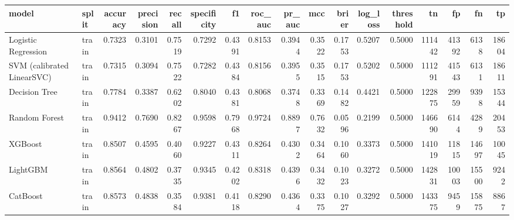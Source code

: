 \begin{tabular}{llrrrrrrrrrrrrrrr}
\toprule
model & split & accuracy & precision & recall & specificity & f1 & roc\_auc & pr\_auc & mcc & brier & log\_loss & threshold & tn & fp & fn & tp \\
\midrule
Logistic Regression & train & 0.7323 & 0.3101 & 0.7519 & 0.7292 & 0.4391 & 0.8153 & 0.3944 & 0.3522 & 0.1753 & 0.5207 & 0.5000 & 111442 & 41392 & 6138 & 18604 \\
SVM (calibrated LinearSVC) & train & 0.7315 & 0.3094 & 0.7522 & 0.7282 & 0.4384 & 0.8156 & 0.3955 & 0.3515 & 0.1753 & 0.5202 & 0.5000 & 111291 & 41543 & 6131 & 18611 \\
Decision Tree & train & 0.7784 & 0.3387 & 0.6202 & 0.8040 & 0.4381 & 0.8068 & 0.3748 & 0.3369 & 0.1482 & 0.4421 & 0.5000 & 122875 & 29959 & 9398 & 15344 \\
Random Forest & train & 0.9412 & 0.7690 & 0.8267 & 0.9598 & 0.7968 & 0.9724 & 0.8897 & 0.7632 & 0.0596 & 0.2199 & 0.5000 & 146690 & 6144 & 4289 & 20453 \\
XGBoost & train & 0.8507 & 0.4595 & 0.4060 & 0.9227 & 0.4311 & 0.8264 & 0.4302 & 0.3464 & 0.1060 & 0.3373 & 0.5000 & 141019 & 11815 & 14697 & 10045 \\
LightGBM & train & 0.8564 & 0.4802 & 0.3735 & 0.9345 & 0.4202 & 0.8318 & 0.4396 & 0.3432 & 0.1023 & 0.3272 & 0.5000 & 142831 & 10003 & 15500 & 9242 \\
CatBoost & train & 0.8573 & 0.4838 & 0.3584 & 0.9381 & 0.4118 & 0.8290 & 0.4364 & 0.3375 & 0.1027 & 0.3292 & 0.5000 & 143375 & 9459 & 15875 & 8867 \\
\bottomrule
\end{tabular}
